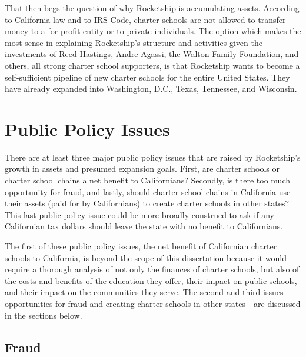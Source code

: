 That then begs the question of why Rocketship is accumulating assets. According to California law and to IRS Code, charter schools are not allowed to transfer money to a for-profit entity or to private individuals. The option which makes the most sense in explaining Rocketship's structure and activities given the investments of Reed Hastings, Andre Agassi, the Walton Family Foundation, and others, all strong charter school supporters, is that Rocketship wants to become a self-sufficient pipeline of new charter schools for the entire United States. They have already expanded into Washington, D.C., Texas, Tennessee, and Wisconsin.

\section{Public Policy Issues}%
\label{sec:publ-policy-chang}\indent%

There are at least three major public policy issues that are raised by Rocketship's growth in assets and presumed expansion goals. First, are charter schools or charter school chains a net benefit to Californians? Secondly, is there too much opportunity for fraud, and lastly, should charter school chains in California use their assets (paid for by Californians) to create charter schools in other states? This last public policy issue could be more broadly construed to ask if any Californian tax dollars should leave the state with no benefit to Californians.

The first of these public policy issues, the net benefit of Californian charter schools to California, is beyond the scope of this dissertation because it would require a thorough analysis of not only the finances of charter schools, but also of the costs and benefits of the education they offer, their impact on public schools, and their impact on the communities they serve. The second and third issues—opportunities for fraud and creating charter schools in other states—are discussed in the sections below.

\subsection{Fraud}%
\label{sec:fraud}\indent%

